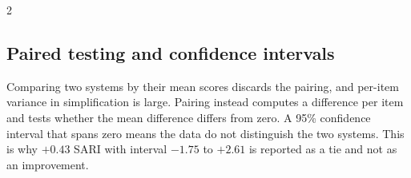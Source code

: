 \documentclass[twocolumn,10pt,a4paper]{article}
\begin{document}
\begin{multicols}{2}
\subsection*{Paired testing and confidence intervals}
Comparing two systems by their mean scores discards the pairing, and per-item
variance in simplification is large. Pairing instead computes a difference per
item and tests whether the mean difference differs from zero. A 95\% confidence
interval that spans zero means the data do not distinguish the two systems. This
is why $+0.43$ SARI with interval $-1.75$ to $+2.61$ is reported as a tie and not
as an improvement.

\end{multicols}
\end{document}

